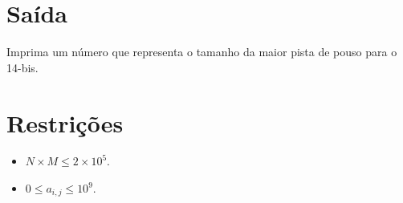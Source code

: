 %
%

\section*{Saída}

Imprima um número que representa o tamanho da maior pista de pouso para o 14-bis.

\section*{Restrições}

\begin{itemize}
  \item $N \times M \leq 2\times 10^5$.
  \item $0 \leq a_{i, j} \leq 10^9$.
\end{itemize}


\exemplo
